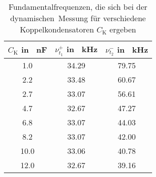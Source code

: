 \begin{table}[h!]
\begin{center}
\begin{tabular}{c | c | c}
	$C_\text{K}$ in \SI{}{\nano\farad} & $\nu_{t_1}^+$ in \SI{}{\kilo\hertz} & $\nu_{t_2}^-$ in \SI{}{\kilo\hertz} \\
\hline
	1.0 & 34.29 & 79.75 \\
	2.2 & 33.48 & 60.67 \\
	2.7 & 33.07 & 56.61 \\
	4.7 & 32.67 & 47.27 \\
	6.8 & 33.07 & 44.03 \\
	8.2 & 33.07 & 42.00 \\
	10.0 & 33.06 & 40.78 \\
	12.0 & 32.67 & 39.16 \\
\end{tabular}
\end{center}
\caption{Fundamentalfrequenzen, die sich bei der \glqq dynamischen\grqq\ Messung für verschiedene Koppelkondensatoren $C_\text{K}$ ergeben}
\label{fig:Freq_dyn}
\end{table}
